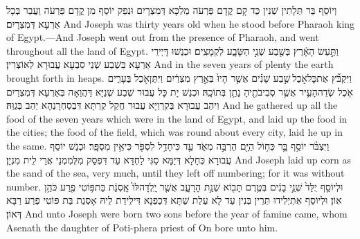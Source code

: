 {וְיוֹסֵף בַּר תְּלָתִין שְׁנִין כַּד קָם קֳדָם פַּרְעֹה מַלְכָּא דְּמִצְרָיִם וּנְפַק יוֹסֵף מִן קֳדָם פַּרְעֹה וַעֲבַר בְּכָל אַרְעָא דְּמִצְרָיִם׃}
{And Joseph was thirty years old when he stood before Pharaoh king of Egypt.—And Joseph went out from the presence of Pharaoh, and went throughout all the land of Egypt.}{}
{וַתַּ֣עַשׂ הָאָ֔רֶץ בְּשֶׁ֖בַע שְׁנֵ֣י הַשָּׂבָ֑ע לִקְמָצִֽים׃}
{וּכְנַשׁוּ דָּיְירֵי אַרְעָא בִּשְׁבַע שְׁנֵי סִבְעָא עֲבוּרָא לְאוֹצְרִין׃}
{And in the seven years of plenty the earth brought forth in heaps.}{}
{וַיִּקְבֹּ֞ץ אֶת\maqqaf כׇּל\maqqaf אֹ֣כֶל \legarmeh  שֶׁ֣בַע שָׁנִ֗ים אֲשֶׁ֤ר הָיוּ֙ בְּאֶ֣רֶץ מִצְרַ֔יִם וַיִּתֶּן\maqqaf אֹ֖כֶל בֶּעָרִ֑ים אֹ֧כֶל שְׂדֵה\maqqaf הָעִ֛יר אֲשֶׁ֥ר סְבִיבֹתֶ֖יהָ נָתַ֥ן בְּתוֹכָֽהּ׃}
{וּכְנַשׁ יָת כָּל עֲבוּר שְׁבַע שְׁנַיָּא דַּהֲוַאָה בְּאַרְעָא דְּמִצְרַיִם וִיהַב עֲבוּרָא בְּקִרְוַיָּא עֲבוּר חֲקַל קַרְתָּא דִּבְסַחְרָנַהָא יְהַב בְּגַוַּהּ׃}
{And he gathered up all the food of the seven years which were in the land of Egypt, and laid up the food in the cities; the food of the field, which was round about every city, laid he up in the same.}{}
{וַיִּצְבֹּ֨ר יוֹסֵ֥ף בָּ֛ר כְּח֥וֹל הַיָּ֖ם הַרְבֵּ֣ה מְאֹ֑ד עַ֛ד כִּי\maqqaf חָדַ֥ל לִסְפֹּ֖ר כִּי\maqqaf אֵ֥ין מִסְפָּֽר׃}
{וּכְנַשׁ יוֹסֵף עֲבוּרָא כְּחָלָא דְּיַמָּא סַגִּי לַחְדָּא עַד דִּפְסַק מִלְּמִמְנֵי אֲרֵי לֵית מִנְיָן׃}
{And Joseph laid up corn as the sand of the sea, very much, until they left off numbering; for it was without number.}{}
{וּלְיוֹסֵ֤ף יֻלַּד֙ שְׁנֵ֣י בָנִ֔ים בְּטֶ֥רֶם תָּב֖וֹא שְׁנַ֣ת הָרָעָ֑ב אֲשֶׁ֤ר יָֽלְדָה\maqqaf לּוֹ֙ אָֽסְנַ֔ת בַּת\maqqaf פּ֥וֹטִי פֶ֖רַע כֹּהֵ֥ן אֽוֹן׃}
{וּלְיוֹסֵף אִתְיְלִידוּ תְּרֵין בְּנִין עַד לָא עַלַת שַׁתָּא דְּכַפְנָא דִּילֵידַת לֵיהּ אָסְנַת בַּת פּוֹטִי פֶרַע רַבָּא דְּאוֹן׃}
{And unto Joseph were born two sons before the year of famine came, whom Asenath the daughter of Poti-phera priest of On bore unto him.}{}
